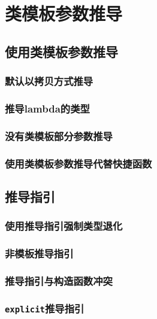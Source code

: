\section{类模板参数推导}\label{ch9}

\subsection{使用类模板参数推导}

\subsubsection{默认以拷贝方式推导}

\subsubsection{推导lambda的类型}

\subsubsection{没有类模板部分参数推导}

\subsubsection{使用类模板参数推导代替快捷函数}

\subsection{推导指引}

\subsubsection{使用推导指引强制类型退化}

\subsubsection{非模板推导指引}

\subsubsection{推导指引与构造函数冲突}

\subsubsection{\texttt{explicit}推导指引}

